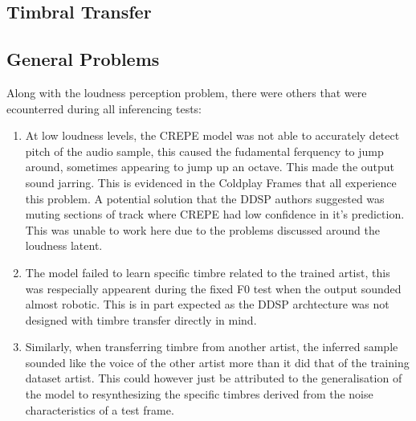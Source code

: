 \subsection{Timbral Transfer}

\subsection{General Problems}

Along with the loudness perception problem, there were others that were ecounterred during all inferencing tests:

\begin{enumerate}
    \item At low loudness levels, the CREPE model was not able to accurately detect pitch of the audio sample, this caused the fudamental ferquency to jump around, sometimes appearing to jump up an octave. This made the output sound jarring. This is evidenced in the Coldplay Frames that all experience this problem. A potential solution that the DDSP authors suggested was muting sections of track where CREPE had low confidence in it's prediction. This was unable to work here due to the problems discussed around the loudness latent.
    \item The model failed to learn specific timbre related to the trained artist, this was respecially appearent during the fixed F0 test when the output sounded almost robotic. This is in part expected as the DDSP archtecture was not designed with timbre transfer directly in mind.
    \item Similarly, when transferring timbre from another artist, the inferred sample sounded like the voice of the other artist more than it did that of the training dataset artist. This could however just be attributed to the generalisation of the model to resynthesizing the specific timbres derived from the noise characteristics of a test frame.
\end{enumerate}